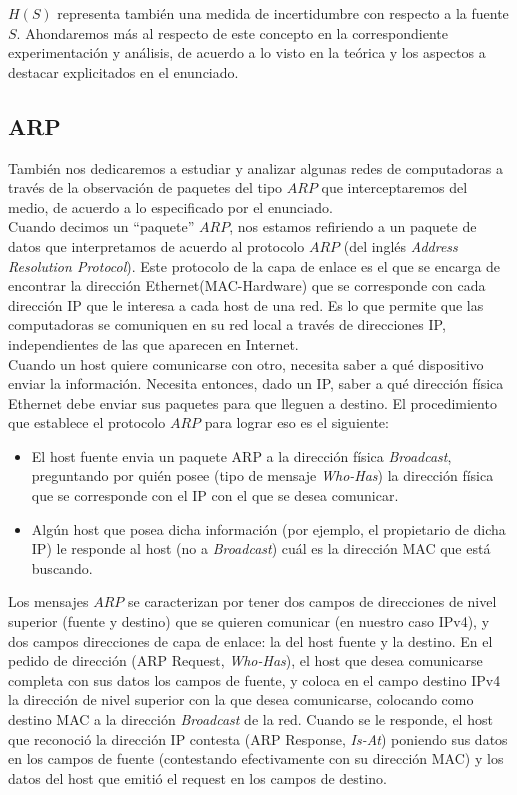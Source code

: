$H(S)$ representa también una medida de incertidumbre con respecto a la fuente $S$. Ahondaremos más al respecto de
este concepto en la correspondiente experimentación y análisis, de acuerdo a lo visto en la teórica y los aspectos a destacar explicitados en el enunciado.\\

\subsection{ARP}

También nos dedicaremos a estudiar y analizar algunas 
redes de computadoras a través de la observación de paquetes del tipo $ARP$ que
interceptaremos del medio, de acuerdo a lo especificado por el enunciado.\\

Cuando decimos un ``paquete'' $ARP$, nos estamos refiriendo a un paquete de datos
que interpretamos de acuerdo al protocolo $ARP$ 
(del inglés \textit{Address Resolution Protocol}). Este protocolo de la capa de enlace
es el que se encarga de encontrar la dirección Ethernet(MAC-Hardware) que se corresponde
con cada dirección IP que le interesa a cada host de una red. Es lo que permite que
las computadoras se comuniquen en su red local a través de direcciones IP, independientes
de las que aparecen en Internet.\\

Cuando un host quiere comunicarse con otro, necesita saber a qué dispositivo enviar
la información. Necesita entonces, dado un IP, saber a qué dirección física Ethernet
debe enviar sus paquetes para que lleguen a destino. El procedimiento que establece
el protocolo $ARP$ para lograr eso es el siguiente:

\begin{itemize}
 \item El host fuente envia un paquete ARP a la dirección física \textit{Broadcast}, preguntando por
 quién posee (tipo de mensaje \textit{Who-Has}) la dirección física que se corresponde
 con el IP con el que se desea comunicar.
 \item Algún host que posea dicha información (por ejemplo, el propietario de dicha IP)
 le responde al host (no a \textit{Broadcast}) cuál es la dirección MAC que está buscando.
\end{itemize}

Los mensajes $ARP$ se caracterizan por tener dos campos de direcciones de nivel superior
(fuente y destino) que se quieren comunicar (en nuestro caso IPv4), y dos campos direcciones
de capa de enlace: la del host fuente y la destino. En el pedido
de dirección (ARP Request, \textit{Who-Has}), el host que desea comunicarse completa
con sus datos los campos de fuente, y coloca en el campo destino IPv4 la dirección de
nivel superior con la que desea comunicarse, colocando como destino MAC a la dirección
\textit{Broadcast} de la red. Cuando se le responde, el host que reconoció
la dirección IP contesta (ARP Response, \textit{Is-At}) poniendo sus datos en los 
campos de fuente (contestando efectivamente con su dirección MAC) y los datos del host
que emitió el request en los campos de destino.\\

